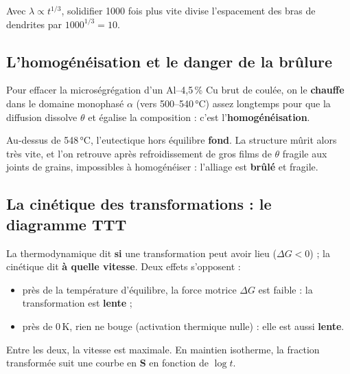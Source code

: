 \begin{exbox}[title={Exemple chiffré (pas dans les diapositives)}]
Avec $\lambda \propto t^{1/3}$, solidifier 1000 fois plus vite divise l'espacement des bras de
dendrites par $1000^{1/3} = 10$.
\end{exbox}

\subsection*{L'homogénéisation et le danger de la brûlure}

Pour effacer la microségrégation d'un Al--4,5\,\% Cu brut de coulée, on le \textbf{chauffe}
dans le domaine monophasé $\alpha$ (vers 500--540\,°C) assez longtemps pour que la diffusion
dissolve $\theta$ et égalise la composition : c'est l'\textbf{homogénéisation}.

\begin{warnbox}[title={Rester sous la température eutectique !}]
Au-dessus de 548\,°C, l'eutectique hors équilibre \textbf{fond}. La structure mûrit alors très
vite, et l'on retrouve après refroidissement de gros films de $\theta$ fragile aux joints de
grains, impossibles à homogénéiser : l'alliage est \textbf{brûlé} et fragile.
\end{warnbox}

\subsection*{La cinétique des transformations : le diagramme TTT}

La thermodynamique dit \textbf{si} une transformation peut avoir lieu ($\Delta G < 0$) ; la
cinétique dit \textbf{à quelle vitesse}. Deux effets s'opposent :
\begin{itemize}
  \item près de la température d'équilibre, la force motrice $\Delta G$ est faible : la
        transformation est \textbf{lente} ;
  \item près de 0\,K, rien ne bouge (activation thermique nulle) : elle est aussi \textbf{lente}.
\end{itemize}
Entre les deux, la vitesse est maximale. En maintien isotherme, la fraction transformée suit
une courbe en \textbf{S} en fonction de $\log t$.


